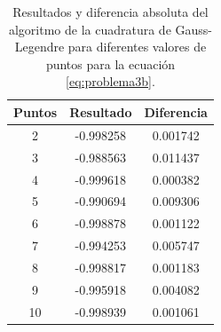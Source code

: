 \begin{enumerate}
          \begin{table}[H]
              \centering
              \begin{tabular}{ccc} \hline
                  \textbf{Puntos} & \textbf{Resultado} & \textbf{Diferencia} \\ \hline
                  2               & -0.998258          & 0.001742            \\
                  3               & -0.988563          & 0.011437            \\
                  4               & -0.999618          & 0.000382            \\
                  5               & -0.990694          & 0.009306            \\
                  6               & -0.998878          & 0.001122            \\
                  7               & -0.994253          & 0.005747            \\
                  8               & -0.998817          & 0.001183            \\
                  9               & -0.995918          & 0.004082            \\
                  10              & -0.998939          & 0.001061            \\ \hline
              \end{tabular}
              \caption{Resultados y diferencia absoluta del algoritmo de la cuadratura de  Gauss-Legendre para diferentes valores de puntos para la ecuación \ref{eq:problema3b}.}
              \label{table:problema3b}
          \end{table}


\end{enumerate}
